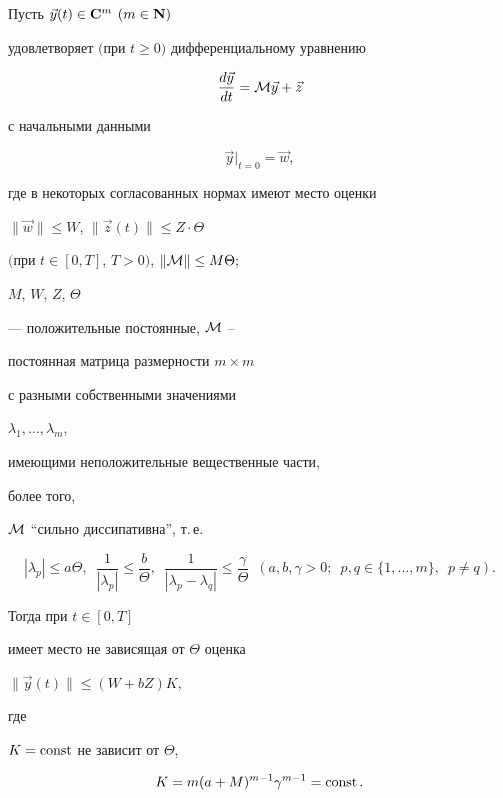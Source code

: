 \begin{lem}


\label{linsystlemma}


Пусть $\Vec{y}(t)\in{\bold{C}}^m$ $(m\in{\bold{N}})$


удовлетворяет $($при $t\geq 0)$ дифференциальному уравнению


$$






\frac{d\Vec{y}}{dt}={\cal{M}}\Vec{y}+\Vec{z}




$$


с начальными данными


$$






\Vec{y}|_{t=0}=\Vec{w},




$$


где в некоторых согласованных нормах имеют место оценки


$\|\Vec{w}\|\leq W$, $\|\Vec{z}(t)\|\leq Z\cdot\Theta$


$($при $t\in[0,T]$, $T>0)$, $\|{\cal{M}}\|\leq M\Theta;$


$M$, $W$, $Z$, $\Theta$


--- положительные постоянные, ${\cal{M}}$ --


постоянная матрица размерности $m\times m$


с разными собственными значениями


$\lambda_1,\dotsc,\lambda_m$,


имеющими неположительные вещественные части,


более того,


${\cal{M}}$ ``сильно диссипативна'', т.\,е.


$$


| \lambda_p|\leq a\Theta, \ \;


\frac{1}{|\lambda_p|}\leq \frac{b}{\Theta},\ \;


\frac{1}{|\lambda_p-\lambda_q|}\leq \frac{\gamma}{\Theta}\ \;


(a,b,\gamma>0;\ \; p,q\in\{1,\dotsc,m \},\ \; p\neq q ).


$$


Тогда при $t\in[0,T]$


имеет место не зависящая от $\Theta$ оценка


$\|\Vec{y}(t)\|\leq( W+b Z)K$,


где


$K=\operatorname{const}$ не зависит от $\Theta$,


\begin{equation} \label{K=}


K={m}(a+M)^{m-1}\gamma^{m-1}=\const.


\end{equation}


\end{lem}

